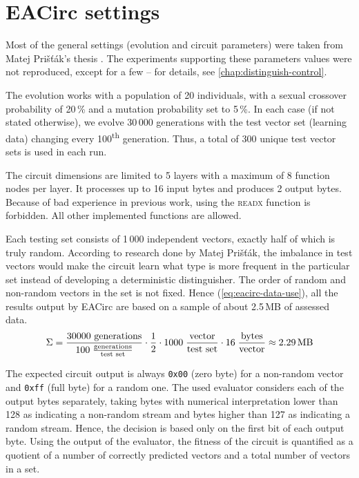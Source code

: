 \documentclass[12pt,oneside]{fithesis2}		%
\renewcommand{\_}{\leavevmode \kern0.0em\vbox{\hrule width0.4em}}
\begin{document}
\section{EACirc settings}
\label{sec:settings-eacirc}

Most of the general settings (evolution and circuit parameters) were taken from Matej Prišťák's thesis \parencite{thesis-pristak}. 
The experiments supporting these parameters values were not reproduced, except for a few -- for details,
see \autoref{chap:distinguish-control}.

The evolution works with a population of 20 individuals, with a sexual crossover probability of 20\,\% and a mutation probability
set to 5\,\%. In each case (if not stated otherwise), we evolve 30\,000 generations with the test vector set
(learning data) changing every 100\textsuperscript{th} generation. Thus, a total of 300 unique test vector sets is used in each run.

The circuit dimensions are limited to 5 layers with a maximum of 8 function nodes per layer. It processes up to 16 input bytes
and produces 2 output bytes. Because of bad experience in previous work, using the \textsc{readx} function is forbidden.
All other implemented functions are allowed.

Each testing set consists of 1\,000 independent vectors, exactly half of which is truly random. 
According to research done by Matej Prišťák, the imbalance in test vectors would make the circuit learn what type is more frequent
in the particular set instead of developing a deterministic distinguisher. 
The order of random and non-random vectors in the set is not fixed.
Hence (\autoref{eq:eacirc-data-use}), all the results output by EACirc are based on a sample of about 2.5\,MB of assessed data.
\begin{equation}
\label{eq:eacirc-data-use}
\Sigma = \frac{30000 \text{ generations}}{100 \; \frac{\text{generations}}{\text{test set}}}
         \cdot \frac{1}{2} \cdot 1000 \; \frac{\text{vector}}{\text{test set}}
         \cdot 16 \; \frac{\text{bytes}}{\text{vector}}
         \approx 2.29 \text{\,MB}
\end{equation}

The expected circuit output is always \texttt{0x00} (zero byte) for a non-random vector and \texttt{0xff} (full byte) 
for a random one.
The used evaluator considers each of the output bytes separately, taking bytes with numerical interpretation lower than
128 as indicating a non-random stream and bytes higher than 127 as indicating a random stream.
Hence, the decision is based only on the first bit of each output byte.
Using the output of the evaluator, the fitness of the circuit is quantified as a quotient of a number of 
correctly predicted vectors and a total number of vectors in a set.
\end{document}
